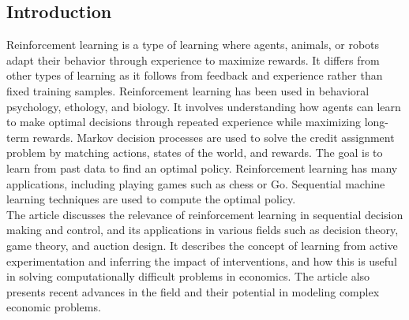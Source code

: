 \documentclass{article}
\begin{document}
\subsection{Introduction}
Reinforcement learning is a type of learning where agents, animals, or robots adapt their behavior through experience to maximize rewards. It differs from other types of learning as it follows from feedback and experience rather than fixed training samples. Reinforcement learning has been used in behavioral psychology, ethology, and biology. It involves understanding how agents can learn to make optimal decisions through repeated experience while maximizing long-term rewards. Markov decision processes are used to solve the credit assignment problem by matching actions, states of the world, and rewards. The goal is to learn from past data to find an optimal policy. Reinforcement learning has many applications, including playing games such as chess or Go. Sequential machine learning techniques are used to compute the optimal policy.\\
The article discusses the relevance of reinforcement learning in sequential decision making and control, and its applications in various fields such as decision theory, game theory, and auction design. It describes the concept of learning from active experimentation and inferring the impact of interventions, and how this is useful in solving computationally difficult problems in economics. The article also presents recent advances in the field and their potential in modeling complex economic problems.\\
\end{document}
